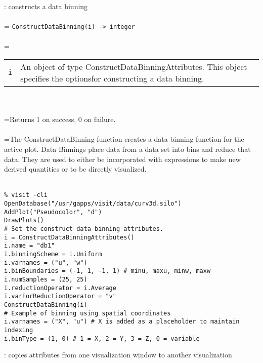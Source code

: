 \documentclass[10pt,a4paper]{report}
\begin{document}
{}
: constructs a data binning\\[-3mm]

 \\ 
\hangindent=\parindent 
\verb!ConstructDataBinning(i) -> integer!\\ [-3mm]

 \\ 
\hangindent=\parindent 
\begin{tabular}{lp{9cm}}
\verb!i! & An object of type ConstructDataBinningAttributes.  This object specifies the optionsfor constructing a data binning. \\
\end{tabular} \\[-2mm]


 \\ 
\hangindent=\parindent Returns 1 on success, 0 on failure. \\[-3mm] 

 \\ 
\hangindent=\parindent The ConstructDataBinning function creates a data binning function for the active  plot.  Data Binnings place data from a data set into bins and reduce that data.   They are used to either be incorporated with expressions to make new derived quantities  or to be directly visualized. \\[-3mm] 

\\[-6mm]
\begin{verbatim}% visit -cli
OpenDatabase("/usr/gapps/visit/data/curv3d.silo")
AddPlot("Pseudocolor", "d")
DrawPlots()
# Set the construct data binning attributes.
i = ConstructDataBinningAttributes()
i.name = "db1"
i.binningScheme = i.Uniform
i.varnames = ("u", "w")
i.binBoundaries = (-1, 1, -1, 1) # minu, maxu, minw, maxw
i.numSamples = (25, 25)
i.reductionOperator = i.Average
i.varForReductionOperator = "v"
ConstructDataBinning(i)
# Example of binning using spatial coordinates
i.varnames = ("X", "u") # X is added as a placeholder to maintain indexing
i.binType = (1, 0) # 1 = X, 2 = Y, 3 = Z, 0 = variable
\end{verbatim}
\newpage


{}
: copies attributes from one visualization window to another visualization\\[-3mm]
\end{document}
